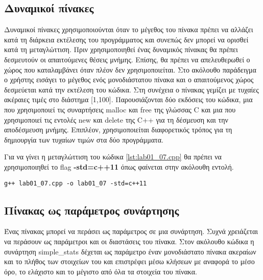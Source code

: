 \subsection{Δυναμικοί πίνακες}
Δυναμικοί πίνακες χρησιμοποιούνται όταν το μέγεθος του πίνακα πρέπει να αλλάζει κατά τη διάρκεια εκτέλεσης του προγράμματος και συνεπώς δεν μπορεί να ορισθεί κατά τη μεταγλώττιση. Πριν χρησιμοποιηθεί ένας δυναμικός πίνακας θα πρέπει δεσμευτούν οι απαιτούμενες θέσεις μνήμης. Επίσης, θα πρέπει να απελευθερωθεί ο χώρος που καταλαμβάνει όταν πλέον δεν χρησιμοποιείται. Στο ακόλουθο παράδειγμα ο χρήστης εισάγει το μέγεθος ενός μονοδιάστατου πίνακα και ο απαιτούμενος χώρος δεσμεύεται κατά την εκτέλεση του κώδικα. Στη συνέχεια ο πίνακας γεμίζει με τυχαίες ακέραιες τιμές στο διάστημα [1,100]. Παρουσιάζονται δύο εκδόσεις του κώδικα, μια που χρησιμοποιεί τις συναρτήσεις malloc και free της γλώσσας C και μια που χρησιμοποιεί τις εντολές new και delete της C++ για τη δέσμευση και την αποδέσμευση μνήμης. Επιπλέον, χρησιμοποιείται διαφορετικός τρόπος για τη δημιουργία των τυχαίων τιμών στα δύο προγράμματα.








Για να γίνει η μεταγλώττιση του κώδικα \ref{lst:lab01_07.cpp} θα πρέπει να χρησιμοποιηθεί το flag \textbf{-std=c++11} όπως φαίνεται στην ακόλουθη εντολή.

\begin{lstlisting}[style=DOS]
g++ lab01_07.cpp -o lab01_07 -std=c++11
\end{lstlisting}

\subsection{Πίνακας ως παράμετρος συνάρτησης}
Ένας πίνακας μπορεί να περάσει ως παράμετρος σε μια συνάρτηση. Συχνά χρειάζεται να περάσουν ως παράμετροι και οι διαστάσεις του πίνακα. Στον ακόλουθο κώδικα η συνάρτηση simple\_stats δέχεται ως παράμετρο έναν μονοδιάστατο  πίνακα ακεραίων και το πλήθος των στοιχείων του και επιστρέφει μέσω κλήσεων με αναφορά το μέσο όρο, το ελάχιστο και το μέγιστο από όλα τα στοιχεία του πίνακα.

